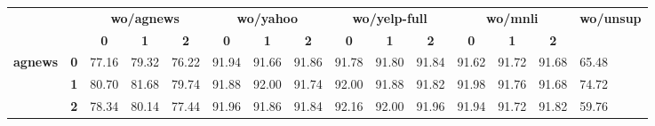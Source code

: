 \begin{table*}
	\centering
	\fontsize{8}{12}
	\selectfont
	\begin{tabular}{lllllllllllllll}
		\toprule
		\multicolumn{1}{l}{\textbf{}}       & \textbf{}  & \multicolumn{3}{c}{\textbf{wo/agnews}}                                                              & \multicolumn{3}{c}{\textbf{wo/yahoo}}                                                               & \multicolumn{3}{c}{\textbf{wo/yelp-full}}                                                           & \multicolumn{3}{c}{\textbf{wo/mnli}}                                                                & \multicolumn{1}{c}{\multirow{2}{*}{\textbf{wo/unsup}}} \\
		\multicolumn{1}{l}{\textbf{}}       & \textbf{}  & \multicolumn{1}{c}{\textbf{0}} & \multicolumn{1}{c}{\textbf{1}} & \multicolumn{1}{c}{\textbf{2}} & \multicolumn{1}{c}{\textbf{0}} & \multicolumn{1}{c}{\textbf{1}} & \multicolumn{1}{c}{\textbf{2}} & \multicolumn{1}{c}{\textbf{0}} & \multicolumn{1}{c}{\textbf{1}} & \multicolumn{1}{c}{\textbf{2}} & \multicolumn{1}{c}{\textbf{0}} & \multicolumn{1}{c}{\textbf{1}} & \multicolumn{1}{c}{\textbf{2}} & \multicolumn{1}{c}{}    \\
		\hline
		\multirow{3}{*}{\textbf{agnews}}    & \textbf{0} & 77.16                          & 79.32                          & 76.22                          & 91.94                          & 91.66                          & 91.86                          & 91.78                          & 91.80                          & 91.84                          & 91.62                          & 91.72                          & 91.68                          & 65.48                              \\
		& \textbf{1} & 80.70                          & 81.68                          & 79.74                          & 91.88                          & 92.00                          & 91.74                          & 92.00                          & 91.88                          & 91.82                          & 91.98                          & 91.76                          & 91.68                          & 74.72                              \\
		& \textbf{2} & 78.34                          & 80.14                          & 77.44                          & 91.96                          & 91.86                          & 91.84                          & 92.16                          & 92.00                          & 91.96                          & 91.94                          & 91.72                          & 91.82                          & 59.76                              \\

\end{tabular}
\end{table*}
